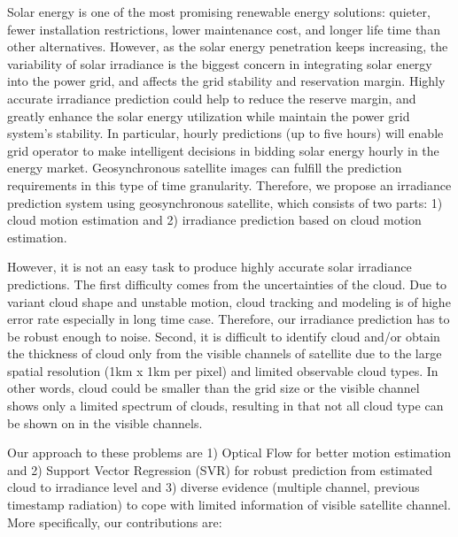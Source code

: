 \documentclass[conference]{IEEEtran}
\begin{document}
Solar energy is one of the most promising renewable energy solutions: quieter,  fewer installation 
restrictions, lower maintenance cost, and longer life time than other alternatives. However, as the solar energy penetration  keeps increasing, the variability of solar irradiance is the biggest 
concern in integrating solar energy into the power grid, and affects the grid stability
and reservation margin. Highly accurate irradiance prediction could help to
reduce the reserve margin, and greatly enhance the solar energy utilization while maintain the power grid system's stability.  In particular,  hourly predictions (up to five hours) will enable grid operator to make intelligent decisions in bidding solar energy hourly in the energy market.   Geosynchronous satellite images can fulfill the prediction requirements in this type of time granularity.
Therefore, we propose an irradiance prediction system using geosynchronous satellite, 
which consists of two parts: 1) cloud motion estimation and 2) irradiance prediction 
based on cloud motion estimation.

However, it is not an easy task to produce highly accurate solar irradiance predictions.
The first difficulty comes from the uncertainties of the cloud. Due to variant
cloud shape and unstable motion, cloud tracking and modeling is of highe error
rate especially in long time case. Therefore, our irradiance prediction has to
be robust enough to noise. Second, it is difficult to identify cloud and/or
obtain the thickness of cloud only from the visible channels of satellite due to
the large spatial resolution (1km x 1km per pixel) and limited  observable cloud
types. In other words, cloud could be smaller than the grid size or the visible channel shows only a limited spectrum of clouds, resulting in that not all cloud 
type can be shown on in the visible channels. %


Our approach to these problems are 1) Optical Flow for better motion estimation 
and 2) Support Vector Regression (SVR) for robust prediction from estimated cloud 
to irradiance level and 3) diverse evidence (multiple channel, previous timestamp 
radiation) to cope with limited information of visible satellite channel. More specifically, 
our contributions are:



\end{document}
